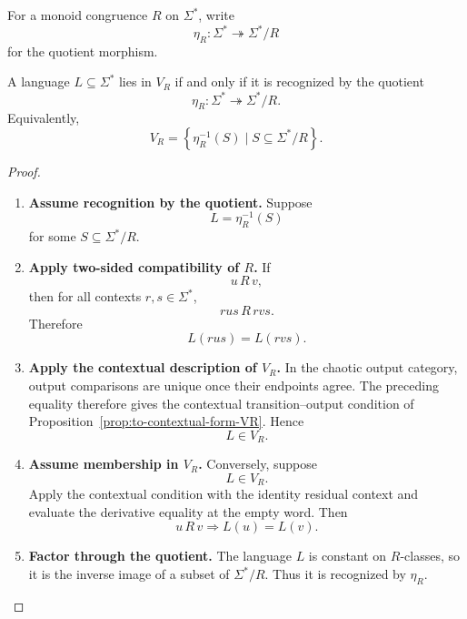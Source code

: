 For a monoid congruence \(R\) on \(\Sigma^*\), write
\[
    \eta_R:
    \Sigma^*\twoheadrightarrow\Sigma^*/R
\]
for the quotient morphism.

\begin{proposition}
\label{prop:to-languages-recognized-congruence}
    A language \(L\subseteq\Sigma^*\) lies in \(V_R\) if and only if it is
    recognized by the quotient
    \[
        \eta_R:
        \Sigma^*\twoheadrightarrow\Sigma^*/R.
    \]
    Equivalently,
    \[
        V_R
        =
        \left\{
            \eta_R^{-1}(S)
            \mid
            S\subseteq\Sigma^*/R
        \right\}.
    \]
\end{proposition}

\begin{proof}
    \leavevmode
    \begin{enumerate}
        \item \textbf{Assume recognition by the quotient.}
        Suppose
        \[
            L=\eta_R^{-1}(S)
        \]
        for some \(S\subseteq\Sigma^*/R\).

        \item \textbf{Apply two-sided compatibility of \(R\).}
        If
        \[
            u\,R\,v,
        \]
        then for all contexts \(r,s\in\Sigma^*\),
        \[
            rus\,R\,rvs.
        \]
        Therefore
        \[
            L(rus)=L(rvs).
        \]

        \item \textbf{Apply the contextual description of \(V_R\).}
        In the chaotic output category, output comparisons are unique once
        their endpoints agree. The preceding equality therefore gives the
        contextual transition--output condition of
        Proposition~\ref{prop:to-contextual-form-VR}. Hence
        \[
            L\in V_R.
        \]

        \item \textbf{Assume membership in \(V_R\).}
        Conversely, suppose
        \[
            L\in V_R.
        \]
        Apply the contextual condition with the identity residual context and
        evaluate the derivative equality at the empty word. Then
        \[
            u\,R\,v
            \Longrightarrow
            L(u)=L(v).
        \]

        \item \textbf{Factor through the quotient.}
        The language \(L\) is constant on \(R\)-classes, so it is the inverse
        image of a subset of \(\Sigma^*/R\). Thus it is recognized by
        \(\eta_R\).
    \end{enumerate}
\end{proof}

